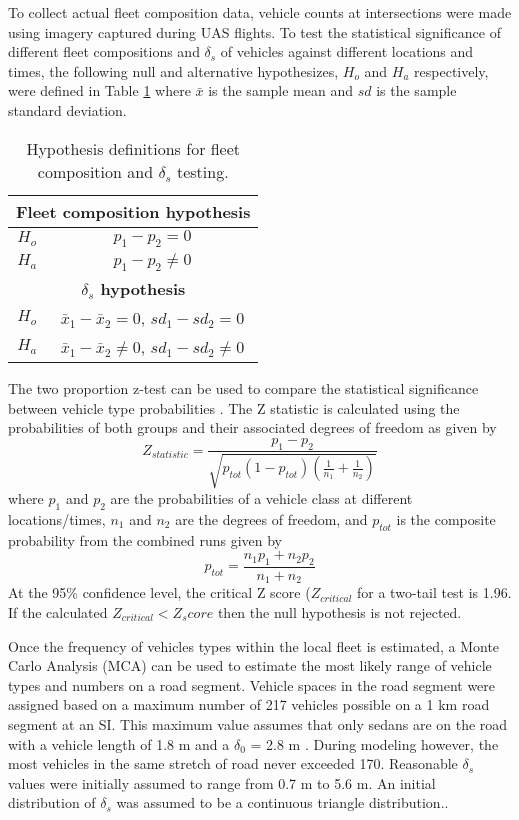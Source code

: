 To collect actual fleet composition data, vehicle counts at intersections were made using imagery captured during UAS flights. To test the statistical significance of different fleet compositions and $\delta_{s}$ of vehicles against different locations and times, the following null and alternative hypothesizes, $H_{o}$ and $H_{a}$ respectively, were defined in Table \ref{tab:vehhyp} where $\bar{x}$ is the sample mean and $sd$ is the sample standard deviation. 
%
\begin{table}[H]
\centering
\caption{Hypothesis definitions for fleet composition and $\delta_{s}$ testing.}
\label{tab:vehhyp}
\begin{tabular}{@{}cc@{}}
\toprule
\multicolumn{2}{c}{\textbf{Fleet composition hypothesis}} \\ \midrule
$H_{o}$ & $p_{1} - p_{2} = 0$ \\
$H_{a}$ & $p_{1} - p_{2} \ne 0$\\ \midrule
\multicolumn{2}{c}{\textbf{$\delta_{s}$ hypothesis}} \\ \midrule
$H_{o}$ & $\bar{x}_{1} - \bar{x}_{2} = 0$, $sd_{1} - sd_{2} = 0$ \\
$H_{a}$ & $\bar{x}_{1} - \bar{x}_{2} \ne 0$, $sd_{1} - sd_{2} \ne 0$ \\ \bottomrule
\end{tabular}
\end{table}
%
The two proportion z-test can be used to compare the statistical significance between vehicle type probabilities \citep{Presnell2008}. The Z statistic is calculated using the probabilities of both groups and their associated degrees of freedom as given by
% 
\begin{equation}
\label{eq:2zteststat}
Z_{statistic} = \frac{p_{1}-p_{2}}{\sqrt{p_{tot}(1-p_{tot})\left ( \frac{1}{n_{1}}+\frac{1}{n_{2}} \right )}}
\end{equation}
%
\noindent
where $p_{1}$ and $p_{2}$ are the probabilities of a vehicle class at different locations/times, $n_{1}$ and $n_{2}$ are the degrees of freedom, and $p_{tot}$ is the composite probability from the combined runs given by
% 
\begin{equation}
\label{eq:2ztesttot}
p_{tot}=\frac{n_{1}p_{1} + n_{2}p_{2}}{n_{1}+n_{2}}
\end{equation}
%
At the 95\% confidence level, the critical Z score ($Z_{critical}$ for a two-tail test is 1.96. If the calculated $Z_{critical} < Z_score$ then the null hypothesis is not rejected. 

Once the frequency of vehicles types within the local fleet is estimated, a Monte Carlo Analysis (MCA) can be used to estimate the most likely range of vehicle types and numbers on a road segment. Vehicle spaces in the road segment were assigned based on a maximum number of 217 vehicles possible on a 1 km road segment at an SI.  This maximum value assumes that only sedans are on the road with a vehicle length of 1.8 m and a $\delta_{0}$ = 2.8 m .  During modeling however, the most vehicles in the same stretch of road never exceeded 170.  Reasonable $\delta_{s}$ values were initially assumed to range from 0.7 m to 5.6 m. An initial distribution of $\delta_{s}$ was assumed to be a continuous triangle distribution..
 
